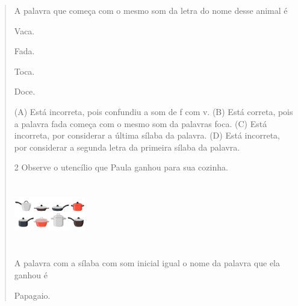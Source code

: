 \begin{verse}

A palavra que começa com o mesmo som da letra do nome desse animal é

\begin{minipage}{.5\textwidth}
\begin{escolha}
\item Vaca.

\item Fada.

\item Toca.

\item Doce.
\end{escolha}
\end{minipage}

(A) Está incorreta, pois confundiu a som de f com v.
(B) Está correta, pois a palavra fada começa com o mesmo som da palavras
foca.
(C) Está incorreta, por considerar a última sílaba da palavra.
(D) Está incorreta, por considerar a segunda letra da primeira sílaba da
palavra.

\num{2} Observe o utencílio que Paula ganhou para sua cozinha.

\includegraphics[width=1.22222in,height=1.11389in]{media/image19.jpeg}


A palavra com a sílaba com som inicial igual o nome da palavra que ela ganhou é

\begin{minipage}{.5\textwidth}
\begin{escolha}
\item Papagaio.


\end{escolha}
\end{minipage}
\end{verse}
